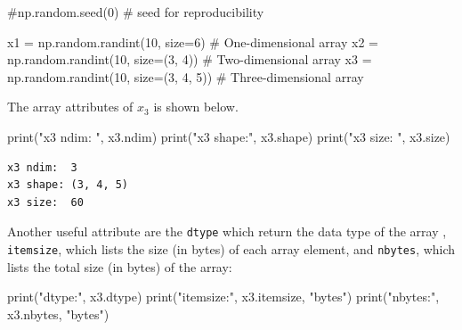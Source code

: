 \documentclass[
  letterpaper,
  DIV=11,
  numbers=noendperiod]{scrreprt}
\newenvironment{Shaded}{\begin{snugshade}}{\end{snugshade}}
\newcommand{\BuiltInTok}[1]{\textcolor[rgb]{0.00,0.23,0.31}{#1}}
\newcommand{\CommentTok}[1]{\textcolor[rgb]{0.37,0.37,0.37}{#1}}
\newcommand{\DecValTok}[1]{\textcolor[rgb]{0.68,0.00,0.00}{#1}}
\newcommand{\NormalTok}[1]{\textcolor[rgb]{0.00,0.23,0.31}{#1}}
\newcommand{\OperatorTok}[1]{\textcolor[rgb]{0.37,0.37,0.37}{#1}}
\newcommand{\StringTok}[1]{\textcolor[rgb]{0.13,0.47,0.30}{#1}}
\theoremstyle{plain}
\theoremstyle{definition}
\theoremstyle{remark}
\begin{document}
\begin{Shaded}
\begin{Highlighting}[]
\CommentTok{\#np.random.seed(0)  \# seed for reproducibility}

\NormalTok{x1 }\OperatorTok{=}\NormalTok{ np.random.randint(}\DecValTok{10}\NormalTok{, size}\OperatorTok{=}\DecValTok{6}\NormalTok{)  }\CommentTok{\# One{-}dimensional array}
\NormalTok{x2 }\OperatorTok{=}\NormalTok{ np.random.randint(}\DecValTok{10}\NormalTok{, size}\OperatorTok{=}\NormalTok{(}\DecValTok{3}\NormalTok{, }\DecValTok{4}\NormalTok{))  }\CommentTok{\# Two{-}dimensional array}
\NormalTok{x3 }\OperatorTok{=}\NormalTok{ np.random.randint(}\DecValTok{10}\NormalTok{, size}\OperatorTok{=}\NormalTok{(}\DecValTok{3}\NormalTok{, }\DecValTok{4}\NormalTok{, }\DecValTok{5}\NormalTok{))  }\CommentTok{\# Three{-}dimensional array}
\end{Highlighting}
\end{Shaded}

The array attributes of \(x_3\) is shown below.

\begin{Shaded}
\begin{Highlighting}[]
\BuiltInTok{print}\NormalTok{(}\StringTok{"x3 ndim: "}\NormalTok{, x3.ndim)}
\BuiltInTok{print}\NormalTok{(}\StringTok{"x3 shape:"}\NormalTok{, x3.shape)}
\BuiltInTok{print}\NormalTok{(}\StringTok{"x3 size: "}\NormalTok{, x3.size)}
\end{Highlighting}
\end{Shaded}

\begin{verbatim}
x3 ndim:  3
x3 shape: (3, 4, 5)
x3 size:  60
\end{verbatim}

Another useful attribute are the \texttt{dtype} which return the data
type of the array , \texttt{itemsize}, which lists the size (in bytes)
of each array element, and \texttt{nbytes}, which lists the total size
(in bytes) of the array:

\begin{Shaded}
\begin{Highlighting}[]
\BuiltInTok{print}\NormalTok{(}\StringTok{"dtype:"}\NormalTok{, x3.dtype)}
\BuiltInTok{print}\NormalTok{(}\StringTok{"itemsize:"}\NormalTok{, x3.itemsize, }\StringTok{"bytes"}\NormalTok{)}
\BuiltInTok{print}\NormalTok{(}\StringTok{"nbytes:"}\NormalTok{, x3.nbytes, }\StringTok{"bytes"}\NormalTok{)}
\end{Highlighting}
\end{Shaded}
\end{document}
